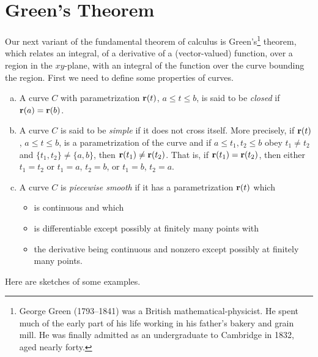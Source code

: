 \section{Green's Theorem}\label{sec:GreenThm}
Our next variant of the fundamental theorem of calculus is 
Green's\footnote{George Green (1793--1841) was a British 
mathematical-physicist. He spent much of the early part of his life
working in his father's bakery and grain mill. He was finally admitted
as an undergraduate to Cambridge in 1832, aged nearly forty.} theorem, which 
relates an integral, of a derivative of a (vector-valued) function,
over a region  in the $xy$-plane, with an integral of the function
over the curve bounding the region. 
First we need to define some properties of curves.

\begin{defn}\label{def:Green}

\begin{enumerate}[(a)]
\item 
A curve $C$ with parametrization $\mathbf{r}(t)$, $a\le t\le b$, is said to be 
\emph{closed} if $\mathbf{r}(a)=\mathbf{r}(b)$.

\item 
A curve $C$ is said to be \emph{simple} if it does not cross itself.
More precisely, if $\mathbf{r}(t)$, $a\le t\le b$, is a parametrization of the
curve and if $a\le t_1,t_2\le b$ obey $t_1\ne t_2$ and $\{t_1,t_2\}
\ne\{a,b\}$, then $\mathbf{r}(t_1)\ne \mathbf{r}(t_2)$. That is, if $\mathbf{r}(t_1)=\mathbf{r}(t_2)$,
then either $t_1=t_2$ or $t_1=a$, $t_2=b$, or $t_1=b$, $t_2=a$.

\item 
A curve $C$ is \emph{piecewise smooth} if it has a parametrization
$\mathbf{r}(t)$ which
\begin{itemize}  \itemsep1pt \parskip0pt  %
\item
is continuous and which
\item
is differentiable except possibly at finitely many points with
\item
the derivative being continuous and nonzero except possibly at finitely 
many points.
\end{itemize}
\end{enumerate}
\end{defn}
\noindent Here are sketches of some examples.

